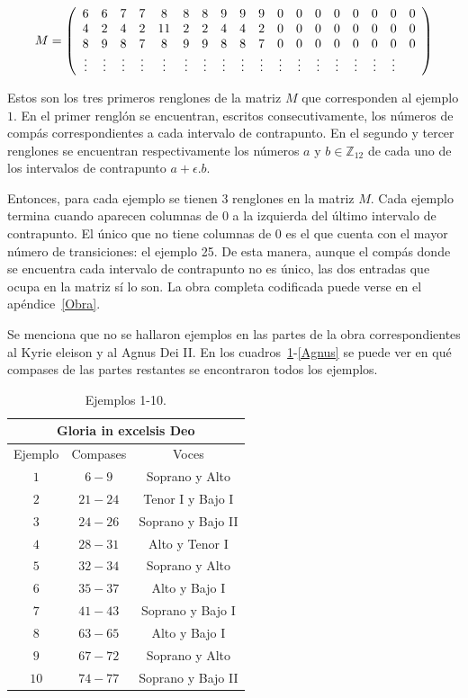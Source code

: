 \documentclass[letterpaper,12pt]{book}
\theoremstyle{definition} \newtheorem{Def}{Definición}[chapter]
\theoremstyle{definition} \newtheorem{Teo}{Teorema}[chapter]
\theoremstyle{definition} \newtheorem{Pro}{Proposición}[chapter]
\theoremstyle{definition} \newtheorem{Lema}{Lema}[chapter]
\begin{document}
\begin{equation*}
M=\left(
\begin{array}{c c c c c c c c c c c c c c c c c c}
6 & 6 & 7 & 7 & 8 & 8 & 8 & 9 & 9 & 9 & 0 & 0 & 0 & 0 & 0 & 0 & 0 & 0 \\
4 & 2 & 4 & 2 & 11 & 2 & 2 & 4 & 4 & 2 & 0 & 0 & 0 & 0 & 0 & 0 & 0 & 0 \\
8 & 9 & 8 & 7 & 8 & 9 & 9 & 8 & 8 & 7 & 0 & 0 & 0 & 0 & 0 & 0 & 0 & 0 \\
\vdots & \vdots & \vdots & \vdots & \vdots & \vdots & \vdots & \vdots & \vdots & 
\vdots & \vdots & \vdots & \vdots & \vdots & \vdots & \vdots & \vdots 
\end{array} 
\right)
\end{equation*}
 
 Estos son los tres primeros renglones de la matriz $M$ que corresponden al ejemplo $1$. En el primer renglón se encuentran, escritos consecutivamente, los números de compás correspondientes a cada intervalo de contrapunto. En el segundo y tercer renglones se encuentran respectivamente los números $a$ y $b \in \mathbb{Z}_{12}$ de cada uno de los intervalos de contrapunto $a+\epsilon.b$. 
 
 Entonces, para cada ejemplo se tienen $3$ renglones en la matriz $M$. Cada ejemplo termina cuando aparecen columnas de $0$ a la izquierda del último intervalo de contrapunto. El único que no tiene columnas de $0$ es el que cuenta con el mayor número de transiciones: el ejemplo 25. De esta manera, aunque el compás donde se encuentra cada intervalo de contrapunto no es único, las dos entradas que ocupa en la matriz sí lo son. La obra completa codificada puede verse en el apéndice~\ref{Obra}.
 
 Se menciona que no se hallaron ejemplos en las partes de la obra correspondientes al Kyrie eleison y al Agnus Dei II. En los cuadros~\ref{Gloria}-\ref{Agnus} se puede ver en qué compases de las partes restantes se encontraron todos los ejemplos.  
 
\begin{table}[h]
\centering
\begin{tabular}{| c | c | c |}
\hline
\multicolumn{3}{|c|}{Gloria in excelsis Deo}\\
\hline
Ejemplo & Compases & Voces\\
\hline
$1$ & $6-9$ & Soprano y Alto\\
$2$ & $21-24$ & Tenor I y Bajo I\\
$3$ & $24-26$ & Soprano y Bajo II\\
$4$ & $28-31$ & Alto y Tenor I\\
$5$ & $32-34$ & Soprano y Alto\\
$6$ & $35-37$ & Alto y Bajo I\\
$7$ & $41-43$ & Soprano y Bajo I\\
$8$ & $63-65$ & Alto y Bajo I\\
$9$ & $67-72$ & Soprano y Alto\\
$10$ & $74-77$ & Soprano y Bajo II\\
\hline
\end{tabular}
\caption{\label{Gloria}Ejemplos 1-10.} 
\end{table}
\end{document}
